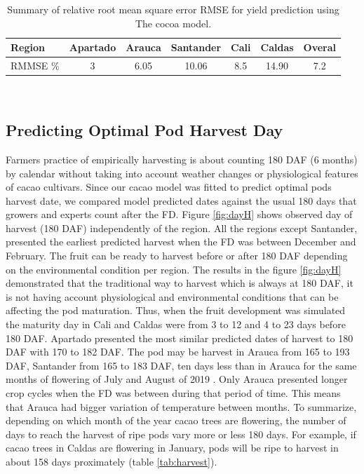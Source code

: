 \documentclass[gene,journal,article,submit,moreauthors,pdftex]{Definitions/mdpi}
\begin{document}
\begin{table}[h!]	
	\caption {\footnotesize {Summary of relative root mean square error RMSE for yield prediction using The cocoa model.}}
	\label{tab:error} 
	\centering
	\begin{small}
		\begin{tabular}{l c c c c c c}
			\hline
			{\bf Region }&{\bf Apartado }&{\bf Arauca}&{\bf Santander}&{\bf Cali}&{\bf Caldas}&{\bf Overal}\\
			\hline
			RMMSE \%  & 3 & 6.05 & 10.06&8.5&14.90&7.2 \\
			\hline
		\end{tabular} \\
	\end{small}
\end{table}
\newpage

\subsection{Predicting Optimal Pod Harvest Day }

Farmers practice of empirically harvesting is about counting  180 DAF (6 months) by calendar without taking into account weather changes or physiological features of cacao cultivars.
Since our cacao model was fitted to predict optimal pods harvest date, we compared model predicted dates against the usual 180 days that growers and experts count after the FD. Figure \ref{fig:dayH} shows observed day of harvest (180 DAF) independently of the region. All the regions except Santander, presented the earliest predicted harvest when the FD was between December and February. The fruit can be ready to harvest before or after 180 DAF depending on the environmental condition per region. The results in the figure \ref{fig:dayH} demonstrated that the traditional way to harvest which is always at 180 DAF, it is not having account physiological and environmental conditions that can be affecting the pod maturation. Thus, when the fruit development was simulated the maturity day in Cali and Caldas were from 3 to 12 and 4 to 23 days before 180 DAF. Apartado presented the most similar predicted dates of harvest to 180 DAF with 170 to 182 DAF. The pod may be harvest in Arauca from 165 to 193 DAF, Santander from 165 to 183 DAF, ten days less than in Arauca for the same months of flowering of July and August of 2019 . Only Arauca presented longer crop cycles when the FD was between during that period of time. This means that Arauca had bigger variation of temperature between months. To summarize, depending on which month of the year cacao trees are flowering,  the number of days to reach the harvest of ripe pods vary more or less 180 days. For example, if cacao trees in Caldas are flowering in January, pods will be ripe to harvest in about 158 days proximately  (table \ref{tab:harvest}). 
 
\end{document}
